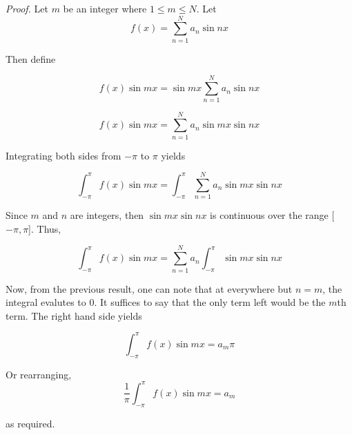 \documentclass[12pt,a4paper]{article}
\begin{document}
\emph{Proof.} Let $m$ be an integer where $1 \leq m \leq N$. Let
\[
f(x) =  \sum_{n = 1}^{N} a_{n} \sin{nx}
\]

Then define

\[
f(x)\sin{mx} = \sin{mx} \sum_{n = 1}^{N} a_{n} \sin{nx}
\]

\[
f(x)\sin{mx} = \sum_{n = 1}^{N} a_{n} \sin{mx} \sin{nx}
\]

Integrating both sides from $-\pi$ to $\pi$ yields

\[
\displaystyle \int_{-\pi}^{\pi} f(x)\sin{mx} = \displaystyle \int_{-\pi}^{\pi} \sum_{n = 1}^{N} a_{n} \sin{mx} \sin{nx} 
\]


Since $m$ and $n$ are integers, then $\sin{mx}\sin{nx}$ is continuous over the range [$-\pi,\pi$]. Thus,

\[
\displaystyle \int_{-\pi}^{\pi} f(x)\sin{mx} = \sum_{n = 1}^{N} a_{n}  \displaystyle \int_{-\pi}^{\pi}  \sin{mx} \sin{nx} 
\]

Now, from the previous result, one can note that at everywhere but $n = m$, the integral evalutes to $0$. It suffices to say that the only term left would be the $m$th term. The right hand side yields

\[
\displaystyle \int_{-\pi}^{\pi} f(x)\sin{mx} = a_m \pi
\]

Or rearranging,
\[
\frac{1}{\pi} \displaystyle \int_{-\pi}^{\pi} f(x)\sin{mx} = a_m
\]

as required.
\end{document}
